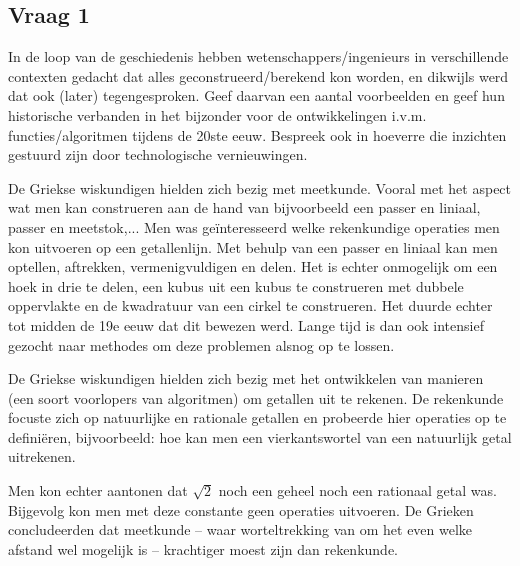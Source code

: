 \documentclass[../main.tex]{subfiles}
\begin{document}
\subsection{Vraag 1}
\begin{question}
In de loop van de geschiedenis hebben wetenschappers/ingenieurs in verschillende
contexten gedacht dat alles geconstrueerd/berekend kon worden, en dikwijls werd 
dat ook (later) tegengesproken. Geef daarvan een aantal voorbeelden en geef hun 
historische verbanden in het bijzonder voor de ontwikkelingen i.v.m. functies/algoritmen 
tijdens de 20ste eeuw. Bespreek ook in hoeverre die inzichten gestuurd zijn door 
technologische vernieuwingen.
\end{question}

\begin{solution}
De Griekse wiskundigen hielden zich bezig met meetkunde. Vooral met het aspect
wat men kan construeren aan de hand van bijvoorbeeld een passer en liniaal,
passer en meetstok,... Men was ge\"interesseerd welke rekenkundige operaties
men kon uitvoeren op een getallenlijn.
Met behulp van een passer en liniaal kan men optellen, aftrekken, vermenigvuldigen
en delen. Het is echter onmogelijk om een hoek in drie te delen, een kubus uit
een kubus te construeren met dubbele oppervlakte en de kwadratuur van een cirkel
te construeren. Het duurde echter tot midden de 19e eeuw dat dit bewezen werd. Lange
tijd is dan ook intensief gezocht naar methodes om deze problemen alsnog op te lossen.

De Griekse wiskundigen hielden zich bezig met het ontwikkelen van manieren (een soort
voorlopers van algoritmen) om getallen uit te rekenen. De rekenkunde focuste zich
op natuurlijke en rationale getallen en probeerde hier operaties op te defini\"eren,
bijvoorbeeld: hoe kan men een vierkantswortel van een natuurlijk getal uitrekenen.

Men kon echter aantonen dat $\sqrt{2}$ noch een geheel noch een rationaal getal
was. Bijgevolg kon men met deze constante geen operaties uitvoeren. De Grieken
concludeerden dat meetkunde -- waar worteltrekking van om het even welke afstand
wel mogelijk is -- krachtiger moest zijn dan rekenkunde.


\end{solution}
\end{document}
